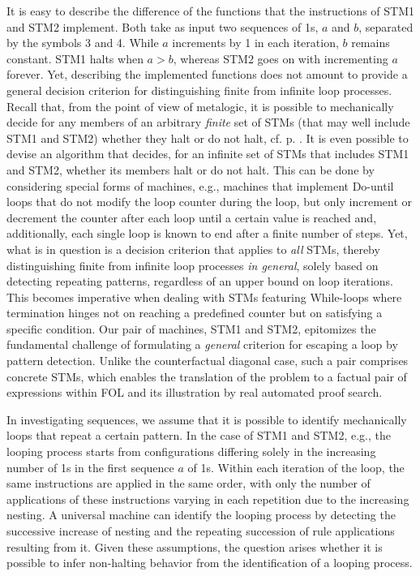 \documentclass[%
  manuscript=article,   %
  year=2024,
  volume=77,
  doi=10.59203/zfn.77.694,
]{zfn}
\begin{document}
It is easy to describe the difference of the functions that the instructions of STM1 and STM2 implement. Both take as input two sequences of 1s, $a$ and $b$, separated by the symbols 3 and 4. While $a$ increments by 1 in each iteration, $b$ remains constant. STM1 halts when $a > b$, whereas STM2 goes on with incrementing $a$ forever. Yet, describing the implemented functions does not amount to provide a general decision criterion for distinguishing finite from infinite loop processes. Recall that, from the point of view of metalogic, it is possible to mechanically decide for any members of an arbitrary \emph{finite} set of STMs (that may well include STM1 and STM2) whether they halt or do not halt, cf. p. \pageref{metafinite}. It is even possible to devise an algorithm that decides, for an infinite set of STMs that includes STM1 and STM2, whether its members halt or do not halt. This can be done by considering special forms of machines, e.g., machines that implement Do-until loops that do not modify the loop counter during the loop, but only increment or decrement the counter after each loop until a certain value is reached and, additionally, each single loop is known to end after a finite number of steps. Yet, what is in question is a decision criterion that applies to \emph{all} STMs, thereby distinguishing finite from infinite loop processes \emph{in general}, solely based on detecting repeating patterns, regardless of an upper bound on loop iterations. This becomes imperative when dealing with STMs featuring While-loops where termination hinges not on reaching a predefined counter but on satisfying a specific condition. Our pair of machines, STM1 and STM2, epitomizes the fundamental challenge of formulating a \emph{general} criterion for escaping a loop by pattern detection. Unlike the counterfactual diagonal case, such a pair comprises concrete STMs, which enables the translation of the problem to a factual pair of expressions within FOL and its illustration by real automated proof search.

In investigating sequences, we assume that it is possible to identify mechanically loops that repeat a certain pattern. In the case of STM1 and STM2, e.g., the looping process starts from configurations differing solely in the increasing number of 1s in the first sequence $a$ of 1s. Within each iteration of the loop, the same instructions are applied in the same order, with only the number of applications of these instructions varying in each repetition due to the increasing nesting. A universal machine can identify the looping process by detecting the successive increase of nesting and the repeating succession of rule applications resulting from it. Given these assumptions, the question arises whether it is possible to infer non-halting behavior from the identification of a looping process. 
\end{document}
